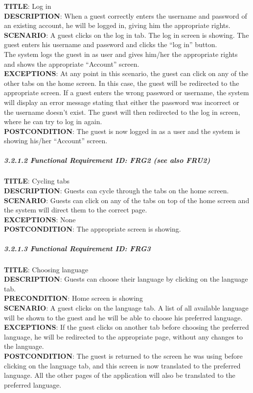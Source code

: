 \documentclass[12pt]{article}
\begin{document}
\textbf{TITLE}: Log in\\\textbf{DESCRIPTION}: When a guest correctly
enters the username and password of an existing account, he will be
logged in, giving him the appropriate rights.\\\textbf{SCENARIO}: A
guest clicks on the log in tab. The log in screen is showing. The guest
enters his username and password and clicks the ``log in'' button.\\The
system logs the guest in as user and gives him/her the appropriate
rights and shows the appropriate ``Account''
screen.\\\textbf{EXCEPTIONS}: At any point in this scenario, the guest
can click on any of the other tabs on the home screen. In this case, the
guest will be redirected to the appropriate screen. If a guest enters
the wrong password or username, the system will display an error message
stating that either the password was incorrect or the username doesn't
exist. The guest will then redirected to the log in screen, where he can
try to log in again.\\\textbf{POSTCONDITION}: The guest is now logged in
as a user and the system is showing his/her ``Account'' screen.

\subparagraph{3.2.1.2 Functional Requirement \textbf{ID}: FRG2 (see also
FRU2)\\}\label{functional-requirement-id-frg2-see-also-fru2}

\textbf{TITLE}: Cycling tabs\\\textbf{DESCRIPTION}: Guests can cycle
through the tabs on the home screen.\\\textbf{SCENARIO}: Guests can
click on any of the tabs on top of the home screen and the system will
direct them to the correct page.\\\textbf{EXCEPTIONS}:
None\\\textbf{POSTCONDITION}: The appropriate screen is showing.

\subparagraph{3.2.1.3 Functional Requirement \textbf{ID}:
FRG3\\}\label{functional-requirement-id-frg3}

\textbf{TITLE}: Choosing language\\\textbf{DESCRIPTION}: Guests can
choose their language by clicking on the language
tab.\\\textbf{PRECONDITION}: Home screen is showing\\\textbf{SCENARIO}:
A guest clicks on the language tab. A list of all available language
will be shown to the guest and he will be able to choose his preferred
language.\\\textbf{EXCEPTIONS}: If the guest clicks on another tab
before choosing the preferred language, he will be redirected to the
appropriate page, without any changes to the
language.\\\textbf{POSTCONDITION}: The guest is returned to the screen
he was using before clicking on the language tab, and this screen is now
translated to the preferred language. All the other pages of the
application will also be translated to the preferred language.
\end{document}
